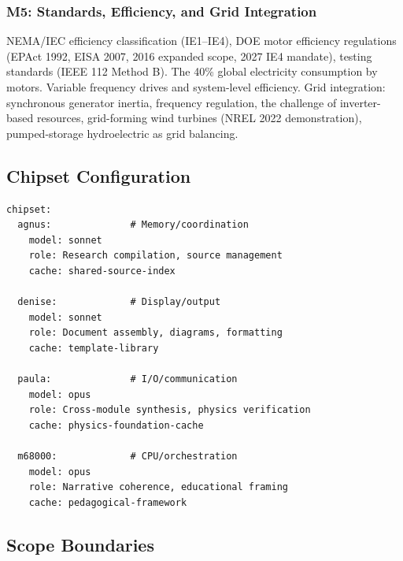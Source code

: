 \documentclass[11pt,letterpaper]{article}
\begin{document}
\subsubsection{M5: Standards, Efficiency, and Grid Integration}
NEMA/IEC efficiency classification (IE1--IE4), DOE motor efficiency regulations (EPAct 1992, EISA 2007, 2016 expanded scope, 2027 IE4 mandate), testing standards (IEEE 112 Method B). The 40\% global electricity consumption by motors. Variable frequency drives and system-level efficiency. Grid integration: synchronous generator inertia, frequency regulation, the challenge of inverter-based resources, grid-forming wind turbines (NREL 2022 demonstration), pumped-storage hydroelectric as grid balancing.

\subsection{Chipset Configuration}

\begin{asciibox}
\begin{verbatim}
chipset:
  agnus:              # Memory/coordination
    model: sonnet
    role: Research compilation, source management
    cache: shared-source-index

  denise:             # Display/output
    model: sonnet
    role: Document assembly, diagrams, formatting
    cache: template-library

  paula:              # I/O/communication
    model: opus
    role: Cross-module synthesis, physics verification
    cache: physics-foundation-cache

  m68000:             # CPU/orchestration
    model: opus
    role: Narrative coherence, educational framing
    cache: pedagogical-framework
\end{verbatim}
\end{asciibox}

\subsection{Scope Boundaries}
\end{document}
